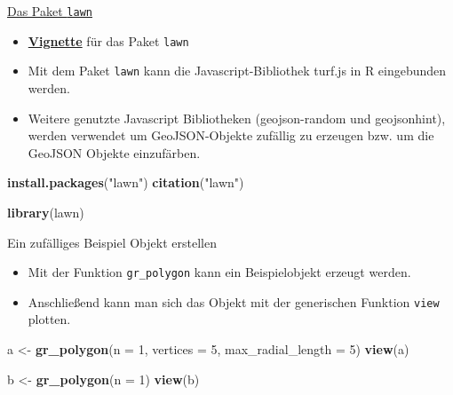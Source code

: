 \documentclass[ignorenonframetext,]{beamer}
\newenvironment{Shaded}{\begin{snugshade}}{\end{snugshade}}
\newcommand{\KeywordTok}[1]{\textcolor[rgb]{0.13,0.29,0.53}{\textbf{#1}}}
\newcommand{\DataTypeTok}[1]{\textcolor[rgb]{0.13,0.29,0.53}{#1}}
\newcommand{\DecValTok}[1]{\textcolor[rgb]{0.00,0.00,0.81}{#1}}
\newcommand{\StringTok}[1]{\textcolor[rgb]{0.31,0.60,0.02}{#1}}
\newcommand{\NormalTok}[1]{#1}
\providecommand{\tightlist}{%
  \setlength{\itemsep}{0pt}\setlength{\parskip}{0pt}}
\begin{document}
\begin{frame}[fragile]{\href{https://cran.r-project.org/web/packages/lawn/index.html}{Das
Paket \texttt{lawn}}}

\begin{itemize}
\item
  \href{https://cran.r-project.org/web/packages/lawn/vignettes/lawn_vignette.html}{\textbf{Vignette}}
  für das Paket \texttt{lawn}
\item
  Mit dem Paket \texttt{lawn} kann die Javascript-Bibliothek turf.js in
  R eingebunden werden.
\item
  Weitere genutzte Javascript Bibliotheken (geojson-random und
  geojsonhint), werden verwendet um GeoJSON-Objekte zufällig zu erzeugen
  bzw. um die GeoJSON Objekte einzufärben.
\end{itemize}

\begin{Shaded}
\begin{Highlighting}[]
\KeywordTok{install.packages}\NormalTok{(}\StringTok{"lawn"}\NormalTok{)}
\KeywordTok{citation}\NormalTok{(}\StringTok{"lawn"}\NormalTok{)}
\end{Highlighting}
\end{Shaded}

\begin{Shaded}
\begin{Highlighting}[]
\KeywordTok{library}\NormalTok{(lawn)}
\end{Highlighting}
\end{Shaded}

\end{frame}

\begin{frame}[fragile]{Ein zufälliges Beispiel Objekt erstellen}

\begin{itemize}
\tightlist
\item
  Mit der Funktion \texttt{gr\_polygon} kann ein Beispielobjekt erzeugt
  werden.
\item
  Anschließend kann man sich das Objekt mit der generischen Funktion
  \texttt{view} plotten.
\end{itemize}

\begin{Shaded}
\begin{Highlighting}[]
\NormalTok{a <-}\StringTok{ }\KeywordTok{gr_polygon}\NormalTok{(}\DataTypeTok{n =} \DecValTok{1}\NormalTok{, }\DataTypeTok{vertices =} \DecValTok{5}\NormalTok{, }\DataTypeTok{max_radial_length =} \DecValTok{5}\NormalTok{)}
\KeywordTok{view}\NormalTok{(a)}
\end{Highlighting}
\end{Shaded}

\begin{Shaded}
\begin{Highlighting}[]
\NormalTok{b <-}\StringTok{ }\KeywordTok{gr_polygon}\NormalTok{(}\DataTypeTok{n =} \DecValTok{1}\NormalTok{)}
\KeywordTok{view}\NormalTok{(b)}
\end{Highlighting}
\end{Shaded}

\end{frame}
\end{document}

